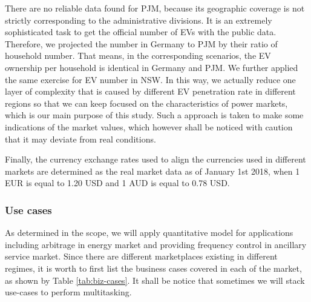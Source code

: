 There are no reliable data found for PJM, because its geographic coverage is not strictly corresponding to the administrative divisions. It is an extremely sophisticated task to get the official number of EVs with the public data. Therefore, we projected the number in Germany to PJM by their ratio of household number. That means, in the corresponding scenarios, the EV ownership per household is identical in Germany and PJM. We further applied the same exercise for EV number in NSW. In this way, we actually reduce one layer of complexity that is caused by different EV penetration rate in different regions so that we can keep focused on the characteristics of power markets, which is our main purpose of this study. Such a approach is taken to make some indications of the market values, which however shall be noticed with caution that it may deviate from real conditions. 

Finally, the currency exchange rates used to align the currencies used in different markets are determined as the real market data as of January 1st 2018, when 1 EUR is equal to 1.20 USD and 1 AUD is equal to 0.78 USD\cite{Bloomberg}.

\subsubsection{Use cases}

As determined in the scope, we will apply quantitative model for applications including arbitrage in energy market and providing frequency control in ancillary service market. Since there are different marketplaces existing in different regimes, it is worth to first list the business cases covered in each of the market, as shown by Table \ref{tab:biz-cases}. It shall be notice that sometimes we will stack use-cases to perform multitasking.

